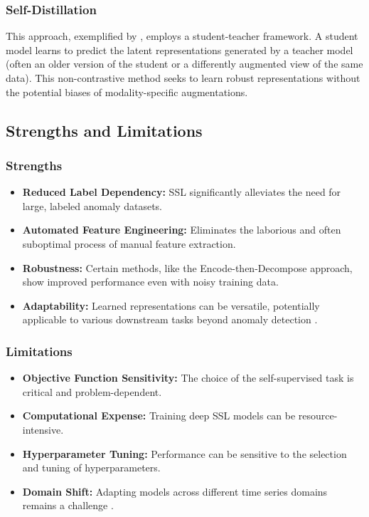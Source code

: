 \documentclass{article}
\begin{document}
\subsubsection{Self-Distillation}
This approach, exemplified by \cite{self_distilled}, employs a student-teacher framework. A student model learns to predict the latent representations generated by a teacher model (often an older version of the student or a differently augmented view of the same data). This non-contrastive method seeks to learn robust representations without the potential biases of modality-specific augmentations.

\subsection{Strengths and Limitations}

\subsubsection{Strengths}
\begin{itemize}
    \item \textbf{Reduced Label Dependency:} SSL significantly alleviates the need for large, labeled anomaly datasets.
    \item \textbf{Automated Feature Engineering:} Eliminates the laborious and often suboptimal process of manual feature extraction.
    \item \textbf{Robustness:} Certain methods, like the Encode-then-Decompose approach, show improved performance even with noisy training data.
    \item \textbf{Adaptability:} Learned representations can be versatile, potentially applicable to various downstream tasks beyond anomaly detection \cite{wearable_sensors}.
\end{itemize}

\subsubsection{Limitations}
\begin{itemize}
    \item \textbf{Objective Function Sensitivity:} The choice of the self-supervised task is critical and problem-dependent.
    \item \textbf{Computational Expense:} Training deep SSL models can be resource-intensive.
    \item \textbf{Hyperparameter Tuning:} Performance can be sensitive to the selection and tuning of hyperparameters.
    \item \textbf{Domain Shift:} Adapting models across different time series domains remains a challenge \cite{cross_domain}.
\end{itemize}
\end{document}
